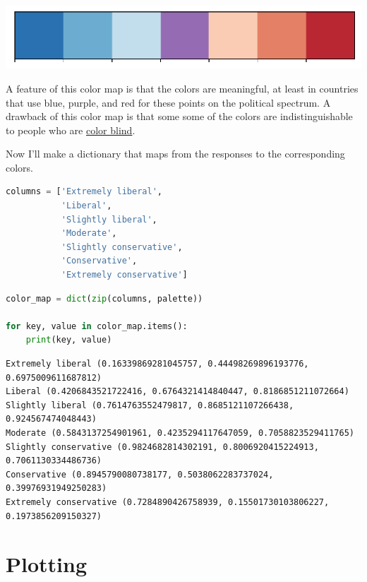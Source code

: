 \begin{center}
\includegraphics[scale=0.75]{02_polviews_files/02_polviews_78_0.pdf}
\end{center}

A feature of this color map is that the colors are meaningful, at least
in countries that use blue, purple, and red for these points on the
political spectrum. A drawback of this color map is that some some of
the colors are indistinguishable to people who are
\href{https://davidmathlogic.com/colorblind}{color blind}.

Now I'll make a dictionary that maps from the responses to the
corresponding colors.

\begin{lstlisting}[language=Python]
columns = ['Extremely liberal', 
           'Liberal', 
           'Slightly liberal', 
           'Moderate', 
           'Slightly conservative', 
           'Conservative',
           'Extremely conservative']
\end{lstlisting}

\begin{lstlisting}[language=Python]
color_map = dict(zip(columns, palette))

for key, value in color_map.items():
    print(key, value)
\end{lstlisting}

\begin{lstlisting}[]
Extremely liberal (0.16339869281045757, 0.44498269896193776, 0.6975009611687812)
Liberal (0.4206843521722416, 0.6764321414840447, 0.8186851211072664)
Slightly liberal (0.7614763552479817, 0.8685121107266438, 0.924567474048443)
Moderate (0.5843137254901961, 0.4235294117647059, 0.7058823529411765)
Slightly conservative (0.9824682814302191, 0.8006920415224913, 0.7061130334486736)
Conservative (0.8945790080738177, 0.5038062283737024, 0.39976931949250283)
Extremely conservative (0.7284890426758939, 0.15501730103806227, 0.1973856209150327)
\end{lstlisting}

\hypertarget{plotting}{%
\section{Plotting}\label{plotting}}

